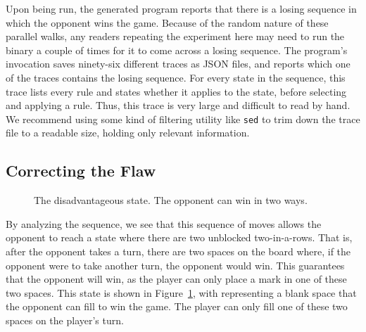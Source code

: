 Upon being run, the generated program reports that there is a losing sequence
in which the opponent wins the game.
Because of the random nature of these parallel walks, any readers repeating the
experiment here may need to run the binary a couple of times for it to come
across a losing sequence.
The program's invocation saves ninety-six different traces as JSON files,
and reports which one of the traces contains the losing sequence.
For every state in the sequence, this trace lists every rule and states whether
it applies to the state, before selecting and applying a rule.
Thus, this trace is very large and difficult to read by hand.
We recommend using some kind of filtering utility like \texttt{sed} to trim
down the trace file to a readable size, holding only relevant information.

\subsection{Correcting the Flaw}\label{subsec:correcting-the-flaw}

\begin{figure}
    \begin{center}
    \end{center}
    \caption{The disadvantageous state. The opponent can win in two ways.}
    \label{fig:ttt-trouble-state}
\end{figure}

By analyzing the sequence, we see that this sequence of moves allows the
opponent to reach a state where there are two unblocked two-in-a-rows.
That is, after the opponent takes a turn, there are two spaces on the board
where, if the opponent were to take another turn, the opponent would win.
This guarantees that the opponent will win, as the player can only place a mark
in one of these two spaces.
This state is shown in Figure~\ref{fig:ttt-trouble-state},
with \tictactoeletter{\#} representing a blank space that the opponent can
fill to win the game.
The player can only fill one of these two spaces on the player's turn.

